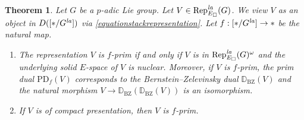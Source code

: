\documentclass[a4paper,10pt]{amsart}
\newtheorem{theorem}{Theorem}[section]
\theoremstyle{remark}
\theoremstyle{definition}
\theoremstyle{plain}
\numberwithin{equation}{section}
\newcommand{\bbD}{{\mathbb D}}
\newcommand{\la}{{\it la}}
\newcommand{\Rep}{{\rm Rep}}
\newcommand{\BZ}{\ensuremath{\mathrm{BZ}}}
\begin{document}
\begin{theorem}\label{theoremprimobject}
	Let $G$ be a $p$-adic Lie group. Let $V\in\Rep^{\la}_{E_{\square}}(G)$. We view $V$ as an object in $D([*/G^{\la}])$ via \eqref{equationstackrepresentation}. Let $f:[*/G^{\la}]\to *$ be the natural map.
	\begin{enumerate}
		\item The representation $V$ is $f$-prim \cite[Def.~4.4.1]{heyer20246functor} if and only if $V$ is in $\Rep^{\la}_{E_{\square}}(G)^{\omega}$ and the underlying solid $E$-space of $V$ is nuclear. Moreover, if $V$ is $f$-prim, the prim dual $\mathrm{PD}_f(V)$ corresponds to the Bernstein--Zelevinsky dual $\bbD_{\BZ}(V)$ and the natural morphism $V\to \bbD_{\BZ}(\bbD_{\BZ}(V))$ is an isomorphism.
		\item If $V$ is of compact presentation, then $V$ is $f$-prim.
	\end{enumerate}
\end{theorem}
\end{document}
